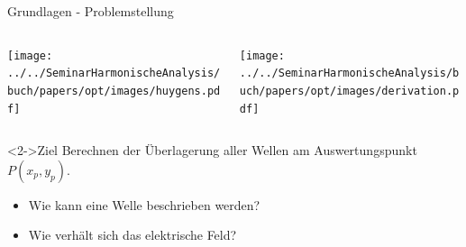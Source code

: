 \begin{frame}{Grundlagen - Problemstellung}
    \begin{columns}
        \begin{column}{0.3\textwidth}
            \texttt{[image: ../../SeminarHarmonischeAnalysis/buch/papers/opt/images/huygens.pdf]}
        \end{column}
        \begin{column}{0.7\textwidth}
            \texttt{[image: ../../SeminarHarmonischeAnalysis/buch/papers/opt/images/derivation.pdf]}
        \end{column}
    \end{columns}

    \begin{block}<2->{Ziel}
        Berechnen der Überlagerung aller Wellen am Auswertungspunkt $P(x_p, y_p)$.

        \begin{itemize}
            \item<3-> Wie kann eine Welle beschrieben werden?
            \item<4-> Wie verhält sich das elektrische Feld?
        \end{itemize}
    \end{block}
\end{frame}

